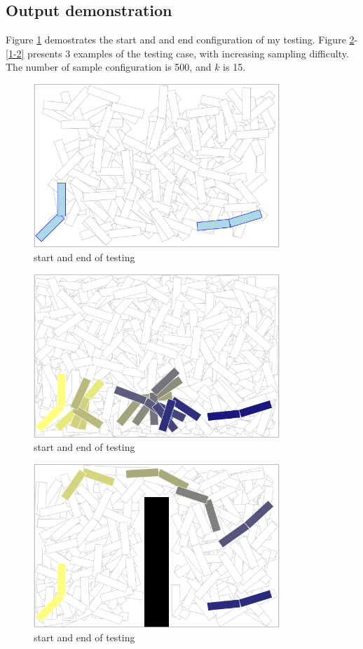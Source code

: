 \documentclass{article}
\begin{document}
\subsection{Output demonstration}
Figure \ref{startendrmp} demostrates the start and and end configuration of my testing. Figure \ref{1-0}-\ref{1-2} presents 3 examples of the testing case, with increasing sampling difficulty. The number of sample configuration is 500, and $k$ is 15.
\begin{figure}[!h]
\centering
\includegraphics[width=0.827\textwidth]{0-1.png}
\caption{start and end of testing}
\label{startendrmp}
\end{figure}

\begin{figure}[!h]
\centering
\includegraphics[width=0.827\textwidth]{1-0.png}
\caption{start and end of testing}
\label{1-0}
\end{figure}

\begin{figure}[!h]
\centering
\includegraphics[width=0.827\textwidth]{1-1.png}
\caption{start and end of testing}
\label{1-1}
\end{figure}
\end{document}
